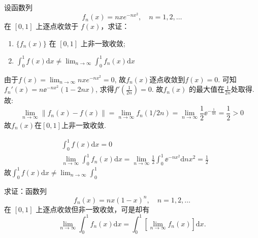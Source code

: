 \begin{problem}
    设函数列\[
        f_n(x) = nx e^{-nx^2} , \quad n = 1, 2, \dots
    \]
    在 \([0, 1]\) 上逐点收敛于 \(f(x)\)，求证：
    \begin{enumerate}
        \item \(\{f_n(x)\}\) 在 \([0, 1]\) 上非一致收敛;
        \item \(\int_{0}^{1} f(x) \mathrm{d}x \neq \lim_{n \to \infty}
            \int_{0}^{1} f_n(x) \mathrm{d}x\)
    \end{enumerate}
\end{problem}

\begin{solution}
    由于\(f(x) = \lim_{n \to \infty} nx e^{-nx^2} = 0\),
    故\(f_{n}(x)\)逐点收敛到\(f(x) = 0\).
    可知\(f_{n}'(x) = n \ee^{-nx^{2}}(1-2nx)\), 求得\(f'\left(
    \frac{1}{2n} \right) = 0\). 故\(f_{n}(x)\)
    的最大值在\(\frac{1}{2n}\)处取得.
    故:
    \[
        \lim_{n \to \infty} \left\lVert f_{n}(x) - f(x) \right\rVert
        = \lim_{n \to \infty} f_{n}(1/2n) = \lim_{n \to \infty}
        \frac{1}{2} \ee^{-\frac{1}{4n}} = \frac{1}{2} >  0
    \]
    故\(f_{n}(x)\)在\([0,1]\)上非一致收敛.

    \begin{align*}
        & \int_{0}^{1} f(x) \mathrm{d}x = 0                       \\
        & \lim_{n \to \infty} \int_{0}^{1} f_{n}(x) \mathrm{d}x =
        \lim_{n \to \infty} \frac{1}{2}\int_{0}^{1}
        \ee^{-nx^{2}} \mathrm{d}nx^{2} = \frac{1}{2}
    \end{align*}
    故\(\int_{0}^{1} f(x) \mathrm{d}x \neq \lim_{n \to
    \infty} \int_{0}^{1}\)

\end{solution}

\begin{problem}
    求证：函数列
    \[
        f_n(x) = nx(1-x)^n, \quad n = 1, 2, \dots
    \]
    在 \([0, 1]\) 上逐点收敛但非一致收敛，可是却有
    \[
        \lim_{n \to \infty} \int_0^1 f_n(x) \mathrm{d}x =
        \int_0^1 \left[
        \lim_{n \to \infty} f_n(x) \right] \mathrm{d}x.
    \]
\end{problem}

